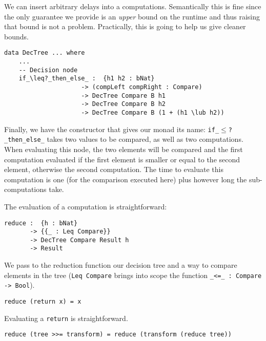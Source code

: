 We can insert arbitrary delays into a computations. Semantically this is fine since the only guarantee we provide is an \emph{upper} bound on the runtime and thus raising that bound is not a problem. Practically, this is going to help us give cleaner bounds.

\begin{lstlisting}[caption={The DecTree Monad},label={lst:dectree:5},emph={DecTree,if,then,else}]
data DecTree ... where
    ...
    -- Decision node
    if_\leq?_then_else_ :  {h1 h2 : bNat}
                     -> (compLeft compRight : Compare)
                     -> DecTree Compare B h1
                     -> DecTree Compare B h2
                     -> DecTree Compare B (1 + (h1 \lub h2))
\end{lstlisting}

Finally, we have the constructor that gives our monad its name: \texttt{if\_$\leq$?\_then\_else\_} takes two values to be compared, as well as two computations. When evaluating this node, the two elements will be compared and the first computation evaluated if the first element is smaller or equal to the second element, otherwise the second computation. The time to evaluate this computation is one (for the comparison executed here) plus however long the sub-computations take.

The evaluation of a computation is straightforward:

\begin{lstlisting}[caption={Evaluating the Monad},label={lst:dectree-eval:1},emph={reduce,DecTree}]
reduce :  {h : bNat}
       -> {{_ : Leq Compare}}
       -> DecTree Compare Result h
       -> Result
\end{lstlisting}

We pass to the reduction function our decision tree and a way to compare elements in the tree (\texttt{Leq Compare} brings into scope the function \texttt{\_<=\_ : Compare -> Bool}).


\begin{lstlisting}[caption={Evaluating the Monad},label={lst:dectree-eval:2},emph={reduce,DecTree,return}]
reduce (return x) = x
\end{lstlisting}

Evaluating a \texttt{return} is straightforward.


\begin{lstlisting}[caption={Evaluating the Monad},label={lst:dectree-eval:3},emph={reduce,DecTree}]
reduce (tree >>= transform) = reduce (transform (reduce tree))
\end{lstlisting}

